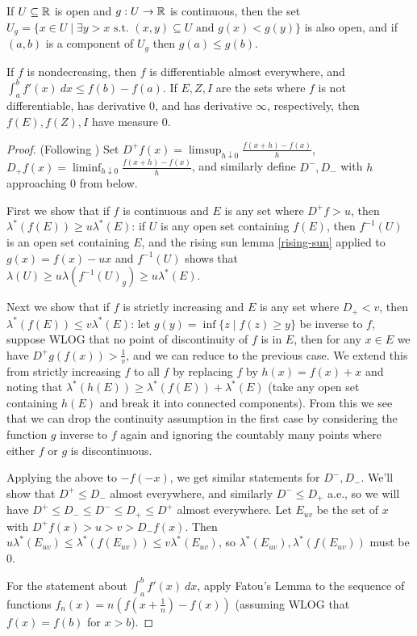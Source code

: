 \begin{lem}\label{rising-sun} If $U \subseteq \mathbb{R}$ is open and $g : U \rightarrow \mathbb{R}$ is continuous, then the set $U_g = \{x \in U \mid \exists y > x \text{ s.t. } (x,y) \subseteq U \text{ and } g(x) < g(y)\}$ is also open, and if $(a,b)$ is a component of $U_g$ then $g(a) \le g(b)$.
\end{lem}

\begin{thm}[Lebesgue]\label{lebesgue-monotone} If $f$ is nondecreasing, then $f$ is differentiable almost everywhere, and $\int_a^b f'(x)\ dx \le f(b) - f(a)$. If $E,Z,I$ are the sets where $f$ is not differentiable, has derivative $0$, and has derivative $\infty$, respectively, then $f(E), f(Z), I$ have measure $0$.
\end{thm}
\begin{proof} (Following \cite{faure-lebesgue}) Set $D^+f(x) = \limsup_{h \downarrow 0} \frac{f(x+h)-f(x)}{h}$, $D_+f(x) = \liminf_{h \downarrow 0} \frac{f(x+h)-f(x)}{h}$, and similarly define $D^-, D_-$ with $h$ approaching $0$ from below.

First we show that if $f$ is continuous and $E$ is any set where $D^+f > u$, then $\lambda^*(f(E)) \ge u\lambda^*(E)$: if $U$ is any open set containing $f(E)$, then $f^{-1}(U)$ is an open set containing $E$, and the rising sun lemma \ref{rising-sun} applied to $g(x) = f(x) - ux$ and $f^{-1}(U)$ shows that $\lambda(U) \ge u\lambda(f^{-1}(U)_g) \ge u\lambda^*(E)$.

Next we show that if $f$ is strictly increasing and $E$ is any set where $D_+ < v$, then $\lambda^*(f(E)) \le v\lambda^*(E)$: let $g(y) = \inf\{z \mid f(z) \ge y\}$ be inverse to $f$, suppose WLOG that no point of discontinuity of $f$ is in $E$, then for any $x \in E$ we have $D^+g(f(x)) > \frac{1}{v}$, and we can reduce to the previous case. We extend this from strictly increasing $f$ to all $f$ by replacing $f$ by $h(x) = f(x)+x$ and noting that $\lambda^*(h(E)) \ge \lambda^*(f(E)) + \lambda^*(E)$ (take any open set containing $h(E)$ and break it into connected components). From this we see that we can drop the continuity assumption in the first case by considering the function $g$ inverse to $f$ again and ignoring the countably many points where either $f$ or $g$ is discontinuous.

Applying the above to $-f(-x)$, we get similar statements for $D^-, D_-$. We'll show that $D^+ \le D_-$ almost everywhere, and similarly $D^- \le D_+$ a.e., so we will have $D^+ \le D_- \le D^- \le D_+ \le D^+$ almost everywhere. Let $E_{uv}$ be the set of $x$ with $D^+f(x) > u > v > D_-f(x)$. Then $u\lambda^*(E_{uv}) \le \lambda^*(f(E_{uv})) \le v\lambda^*(E_{uv})$, so $\lambda^*(E_{uv}), \lambda^*(f(E_{uv}))$ must be $0$.

For the statement about $\int_a^b f'(x)\ dx$, apply Fatou's Lemma to the sequence of functions $f_n(x) = n(f(x+\frac{1}{n}) - f(x))$ (assuming WLOG that $f(x) = f(b)$ for $x > b$).
\end{proof}

